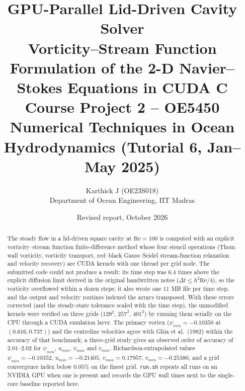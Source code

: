 
\title{\textbf{GPU-Parallel Lid-Driven Cavity Solver}\\[2pt]\large Vorticity--Stream Function Formulation of the 2-D Navier--Stokes Equations in CUDA C\\[2pt]\normalsize Course Project 2 -- OE5450 Numerical Techniques in Ocean Hydrodynamics (Tutorial 6, Jan--May 2025)}
\author{Karthick J (OE23S018)\\Department of Ocean Engineering, IIT Madras}
\date{Revised report, October 2026}
\maketitle
\begin{abstract}
The steady flow in a lid-driven square cavity at $\mathrm{Re}=100$ is computed with an explicit vorticity--stream function finite-difference method whose four stencil operations (Thom wall vorticity, vorticity transport, red--black Gauss--Seidel stream-function relaxation and velocity recovery) are CUDA kernels with one thread per grid node. The submitted code could not produce a result: its time step was 6.4 times above the explicit diffusion limit derived in the original handwritten notes ($\Delta t\le h^2\mathrm{Re}/4$), so the vorticity overflowed within a dozen steps; it also wrote one 11 MB file per time step, and the output and velocity routines indexed the arrays transposed. With these errors corrected (and the steady-state tolerance scaled with the time step), the unmodified kernels were verified on three grids ($129^2$, $257^2$, $401^2$) by running them serially on the CPU through a CUDA emulation layer. The primary vortex ($\psi_{min}=-0.10350$ at $(0.616,0.737)$) and the centreline velocities agree with Ghia et al.\ (1982) within the accuracy of that benchmark; a three-grid study gives an observed order of accuracy of $2.01$--$2.02$ for $\psi_{min}$, $u_{min}$, $v_{max}$ and $v_{min}$, Richardson-extrapolated values $\psi_{min}=-0.10352$, $u_{min}=-0.21405$, $v_{max}=0.17957$, $v_{min}=-0.25380$, and a grid convergence index below $0.05\%$ on the finest grid. \texttt{run.sh} repeats all runs on an NVIDIA GPU when one is present and records the GPU wall times next to the single-core baseline reported here.
\end{abstract}
\tableofcontents\newpage

